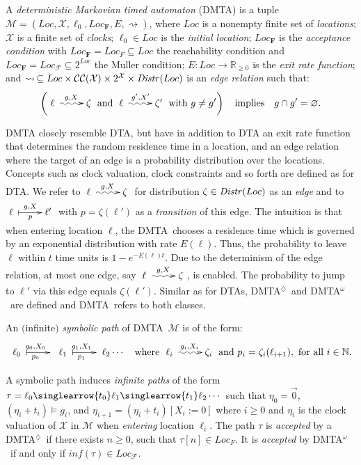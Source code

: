 \documentclass{LMCS}
\makeatletter
\renewcommand{\emptyset}{\varnothing}
\newcommand{\mc}[1]{\mathcal{#1}}
\newcommand{\<}{\langle}
\renewcommand{\>}{\rangle}
\newcommand{\ges}{\geqslant}
\newcommand{\mX}{\mathcal{X}}
\newcommand{\mF}{\mathcal{F}}
\newcommand{\DTA}{\textsc{DTA}}
\newcommand{\DMTAr}{\DMTA$^{\!\Ever}$}
\newcommand{\DMTAo}{\DMTA$^{\omega}$}
\newcommand{\DMTA}{\textsc{DMTA}}
\newcommand{\mv}[1]{\singlearrow{#1}}
\newcommand{\Distr}{{\it Distr}}
\newcommand{\F}{\mathop{\diamondsuit}}
\newcommand{\Nats}{\mathbb{N}}
\newcommand{\Reals}{\mathbb{R}}
\newcommand{\Ever}{\F}
\newcommand{\updownmapsto}[4]{\xymatrix{#1\;\ar @{|->}[r]^{#2}_{#3}&#4}}
\newcommand{\updownsquigarrow}[4]{\xymatrix{#1\;\ar @{~>}[r]^{#2}_{#3}&#4}}
\makeatother
\begin{document}
\begin{defi}[\DMTA]\label{def:MTA} A \emph{deterministic Markovian
timed automaton} (\DMTA) is a tuple $\mc{M} = (Loc,\mc{X},\ell_0, Loc_\mathbf{F}, E,
\rightsquigarrow)$, where $Loc$ is a nonempty finite set of \emph{locations}; $\mc{X}$
is a finite set of \emph{clocks}; $\ell_0\in Loc$ is the \emph{initial location};
$Loc_\mathbf{F}$ is the \emph{acceptance condition} with $Loc_\mathbf{F} =
Loc_F\subseteq Loc$ the reachability condition and $Loc_\mathbf{F} = Loc_\mF
\subseteq 2^{Loc}$ the Muller condition; $E: Loc\to \Reals_{\ges 0}$ is the
\emph{exit rate function}; and $\rightsquigarrow \,\subseteq Loc \times \mCC
({\mc{X}})\times 2^\mX \times \Distr(Loc)$ is an \emph{edge relation} such that:
$$
\left( \updownsquigarrow{\ell}{g,X}{}{\zeta} \mbox{ and }
\updownsquigarrow{\ell}{g',X'}{}{\zeta'} \mbox{ with }
g\neq g' \right) \quad\mbox{implies}  \quad g\cap g'=\emptyset.
$$
\end{defi}

DMTA closely resemble DTA, but have in addition to DTA an exit rate function
that determines the random residence time in a location, and an edge relation
where the target of an edge is a probability distribution over the locations.
Concepts such as clock valuation, clock constraints and so forth are defined as
for \DTA.  We refer to $\updownsquigarrow{\ell}{g,X}{}{\zeta}$ for distribution
$\zeta\in\Distr(Loc)$ as an \emph{edge} and to $\updownmapsto{\ell}{g,X}{p}{\ell'}$ with $p = \zeta(\ell')$ as a \emph{transition} of this edge.  The intuition
is that when entering location $\ell$, the \DMTA\ chooses a residence time which
is governed by an exponential distribution with rate $E(\ell)$.  Thus, the
probability to leave $\ell$ within $t$ time units is $1-e^{-E(\ell)t}$.  Due to the
determinism of the edge relation, at most one edge, say $\updownsquigarrow {\ell}{g,X}{}{\zeta}$, is enabled.  The probability to jump to $\ell'$ via this edge
equals $\zeta(\ell')$.   Similar as for \DTA s, \DMTAr\ and \DMTAo\ are defined
and \DMTA\ refers to both classes.

\begin{defi}
An $($infinite$)$ \emph{symbolic path} of \DMTA\ $\mc{M}$ is of the form:
$$
\updownmapsto{\ell_0}{g_0,X_0}{p_0}{}\updownmapsto{\ell_1}{g_1,X_1}{p_1}{}\ell_2\cdots \quad \mbox{where } \updownsquigarrow{\ell_i}{g_i,X_i}{}{\zeta_i} \mbox{ and }
p_i = \zeta_i(\ell_{i{+}1}), \mbox{ for all } i\in\Nats.
$$


A symbolic path induces \emph{infinite paths} of the form $\tau = \ell_0 \mv{t_0}
\ell_1\mv{t_1}\ell_2\cdots$ such that $\eta_0=\vec{0}$, $(\eta_i+t_i)\models g_{i}$, and
$\eta_{i+1}=(\eta_i+t_i)[X_i:=0]$ where $i\geqslant 0$ and
$\eta_i$ is the clock valuation of $\mc{X}$ in $\mc{M}$ when
\emph{entering} location $\ell_i$.
The path $\tau$ is \emph{accepted} by a \DMTAr\ if there exists $n\ges 0$,
such that $\tau[n]\in Loc_F$. It is \emph{accepted} by
\DMTAo\ if and only if $in\!f({\tau})\in Loc_\mF$.
\end{defi}
\end{document}
